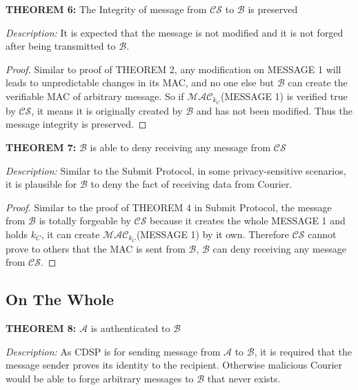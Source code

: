 \vspace{1cm}
\noindent
\textbf{THEOREM 6:} The Integrity of message from $\mathcal{CS}$ to $\mathcal{B}$ is preserved

\bigskip
\noindent
\textit{Description: }It is expected that the message is not modified and it is not forged after being transmitted to $ \mathcal{B} $.
\begin{proof}
Similar to proof of THEOREM 2, any modification on MESSAGE 1 will leads to unpredictable changes in its MAC, and no one else but $\mathcal{B}$ can create the verifiable MAC of arbitrary message. So if $\mathcal{MAC}_{k_C}$(MESSAGE 1) is verified true by $\mathcal{CS}$, it means it is originally created by $\mathcal{B}$ and has not been modified. Thus the message integrity is preserved.
\end{proof}

\vspace{1cm}
\noindent
\textbf{THEOREM 7:} $\mathcal{B}$ is able to deny receiving any message from $\mathcal{CS}$

\bigskip
\noindent
\textit{Description: }Similar to the Submit Protocol, in some privacy-sensitive scenarios, it is plausible for $ \mathcal{B} $ to deny the fact of receiving data from Courier.
\begin{proof}
Similar to the proof of THEOREM 4 in Submit Protocol, the message from $\mathcal{B}$ is totally forgeable by $\mathcal{CS}$ because it creates the whole MESSAGE 1 and holds $k_C$, it can create $\mathcal{MAC}_{k_C}$(MESSAGE 1) by it own. Therefore $\mathcal{CS}$ cannot prove to others that the MAC is sent from $\mathcal{B}$, $\mathcal{B}$ can deny receiving any message from $\mathcal{CS}$.
\end{proof}

\vspace{1cm}
\subsection{On The Whole}
\textbf{THEOREM 8:} $\mathcal{A}$ is authenticated to $\mathcal{B}$

\bigskip
\noindent
\textit{Description: }As CDSP is for sending message from $ \mathcal{A} $ to $ \mathcal{B} $, it is required that the message sender proves its identity to the recipient. Otherwise malicious Courier would be able to forge arbitrary messages to $ \mathcal{B} $ that never exists.

